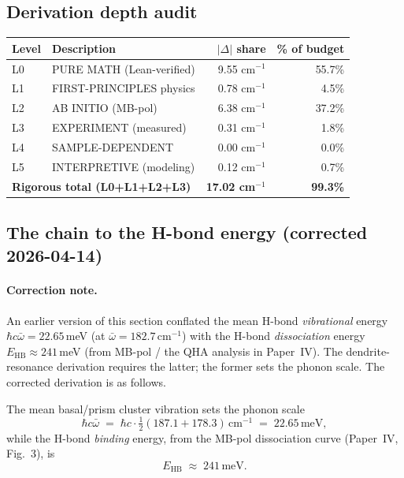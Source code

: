 \documentclass[11pt,a4paper]{article}
\begin{document}
\subsection{Derivation depth audit}
\begin{center}\small
\begin{tabular}{llrr}
\toprule
Level & Description & $|\Delta|$ share & \% of budget \\
\midrule
L0 & PURE MATH (Lean-verified) & 9.55 cm$^{-1}$ & 55.7\% \\
L1 & FIRST-PRINCIPLES physics & 0.78 cm$^{-1}$ & 4.5\% \\
L2 & AB INITIO (MB-pol) & 6.38 cm$^{-1}$ & 37.2\% \\
L3 & EXPERIMENT (measured) & 0.31 cm$^{-1}$ & 1.8\% \\
L4 & SAMPLE-DEPENDENT & 0.00 cm$^{-1}$ & 0.0\% \\
L5 & INTERPRETIVE (modeling) & 0.12 cm$^{-1}$ & 0.7\% \\
\midrule
\multicolumn{2}{l}{\textbf{Rigorous total (L0+L1+L2+L3)}} & \textbf{17.02 cm$^{-1}$} & \textbf{99.3\%} \\
\bottomrule
\end{tabular}
\end{center}

\subsection{The chain to the H-bond energy (corrected 2026-04-14)}

\paragraph{Correction note.}  An earlier version of this section
conflated the mean H-bond \emph{vibrational} energy
$\hbar c \bar\omega = 22.65$\,meV (at $\bar\omega = 182.7$\,cm$^{-1}$)
with the H-bond \emph{dissociation} energy $E_{\text{HB}} \approx
241$\,meV (from MB-pol / the QHA analysis in Paper~IV).  The
dendrite-resonance derivation requires the latter; the former sets
the phonon scale.  The corrected derivation is as follows.

The mean basal/prism cluster vibration sets the phonon scale
\[
\hbar c \bar\omega \;=\; \hbar c \cdot \tfrac{1}{2}(187.1 + 178.3)\,\text{cm}^{-1}
  \;=\; 22.65\,\mathrm{meV},
\]
while the H-bond \emph{binding} energy, from the MB-pol dissociation
curve (Paper~IV, Fig.~3), is
\[
E_{\text{HB}} \;\approx\; 241\,\mathrm{meV}.
\]
\end{document}
